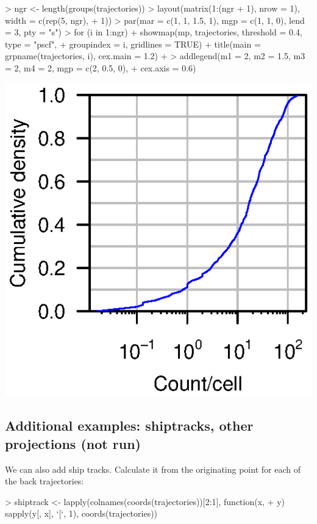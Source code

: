 \documentclass{article}
\renewenvironment{Schunk}{\vspace{\topsep}}{\vspace{\topsep}}
\begin{document}
\begin{Schunk}
\begin{Sinput}
> ngr <- length(groups(trajectories))
> layout(matrix(1:(ngr + 1), nrow = 1), width = c(rep(5, ngr), 
+     1))
> par(mar = c(1, 1, 1.5, 1), mgp = c(1, 1, 0), lend = 3, pty = "s")
> for (i in 1:ngr) {
+     showmap(mp, trajectories, threshold = 0.4, type = "pscf", 
+         groupindex = i, gridlines = TRUE)
+     title(main = grpname(trajectories, i), cex.main = 1.2)
+ }
> addlegend(m1 = 2, m2 = 1.5, m3 = 2, m4 = 2, mgp = c(2, 0.5, 0), 
+     cex.axis = 0.6)
\end{Sinput}
\end{Schunk}
\includegraphics{figures/fig-017}

\subsection{Additional examples: shiptracks, other projections (not run)}


We can also add ship tracks. Calculate it from the originating point
for each of the back trajectories:

\begin{Schunk}
\begin{Sinput}
> shiptrack <- lapply(colnames(coords(trajectories))[2:1], function(x, 
+     y) sapply(y[, x], `[`, 1), coords(trajectories))
\end{Sinput}
\end{Schunk}
\end{document}

